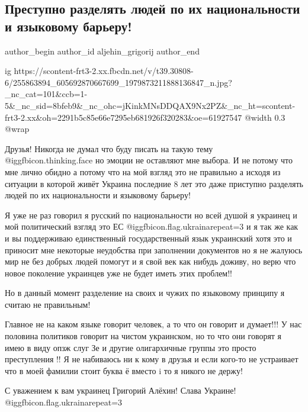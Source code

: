  
 
 
 
 
 
\subsection{Преступно разделять людей по их национальности и языковому барьеру!}
\label{sec:11_11_2021.fb.aljehin_grigorij.1.razdelenie_obschestvo}
 
\ifcmt
 author_begin
   author_id aljehin_grigorij
 author_end
\fi

\ifcmt
  ig https://scontent-frt3-2.xx.fbcdn.net/v/t39.30808-6/255863894_605692870667699_1979873211888136847_n.jpg?_nc_cat=101&ccb=1-5&_nc_sid=8bfeb9&_nc_ohc=jKinkMNsDDQAX9Nx2PZ&_nc_ht=scontent-frt3-2.xx&oh=2291b5c85e66e7295eb681926f320283&oe=61927547
  @width 0.3
  @wrap 
\fi

Друзья! Никогда не думал что буду писать на такую тему  @igg{fbicon.thinking.face}  но эмоции не
оставляют мне выбора. И не потому что мне лично обидно а потому что на мой
взгляд это не правильно а исходя из ситуации в которой живёт Украина последние
8 лет это даже приступно разделять людей по их национальности и языковому
барьеру! 

Я уже не раз говорил я русский по национальности но всей душой я украинец и мой
политический взгляд это ЕС @igg{fbicon.flag.ukraina}{repeat=3}  и я так же как
и вы поддерживаю единственный государственный язык украинский хотя это и
приносит мне некоторые неудобства при заполнении документов но я не жалуюсь мир
не без добрых людей помогут и я свой век как нибудь доживу, но верю что новое
поколение украинцев уже не будет иметь этих проблем!! 

Но в данный момент
разделение на своих и чужих по языковому принципу я считаю не правильным!

Главное не на каком языке говорит человек, а то что он говорит и думает!!! У
нас половина политиков говорит на чистом украинском, но то что они говорят я
имею в виду опзж слуг Зе и другие олигархичные группы это просто преступления
!! Я не набиваюсь ни к кому в друзья и если кого-то не устраивает что в моей
фамилии стоит буква ё вместо i то я никого не держу! 

С уважением к вам украинец Григорий Алёхин! Слава Украине!
@igg{fbicon.flag.ukraina}{repeat=3}

